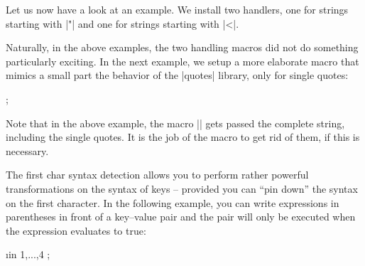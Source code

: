Let us now have a look at an example. We install two handlers, one for strings
starting with |"| and one for strings starting with |<|.
%
\begin{codeexample}[]

\def\myquotemacro#1{Quoted: #1. }
\def\mypointedmacro#1{Pointed: #1. }

\ttfamily {}
\end{codeexample}

Naturally, in the above examples, the two handling macros did not do something
particularly exciting. In the next example, we setup a more elaborate macro
that mimics a small part the behavior of the |quotes| library, only for single
quotes:
%
\begin{codeexample}[]

\def\mysinglequotemacro#1{\pgfkeysalso{label={#1}}}

\tikz {};
\end{codeexample}

Note that in the above example, the macro |\mysinglequotemacro| gets passed the
complete string, including the single quotes. It is the job of the macro to get
rid of them, if this is necessary.

The first char syntax detection allows you to perform rather powerful
transformations on the syntax of keys -- provided you can ``pin down'' the
syntax on the first character. In the following example, you can write
expressions in parentheses in front of a key--value pair and the pair will only
be executed when the expression evaluates to true:
%
\begin{codeexample}[]

\def\myparamacro#1{\myparaparser#1\someendtext}
\def\myparaparser(#1)#2\someendtext{
  \ifx\pgfmathresult\onetext
  \fi
}
\def\onetext{1}

\foreach \i in {1,...,4}
  \tikz {};
\end{codeexample}


